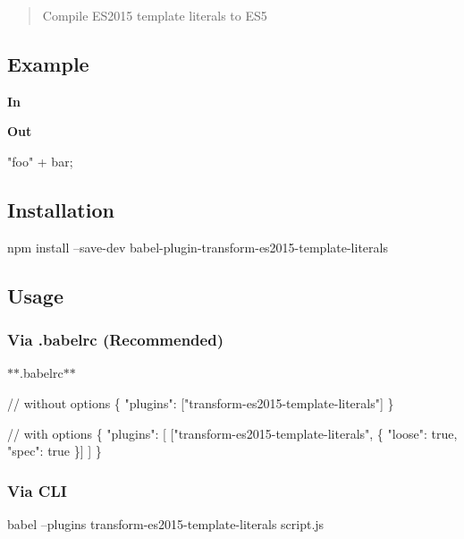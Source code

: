 \begin{quote}
Compile E\+S2015 template literals to E\+S5 \end{quote}


\subsection*{Example}

{\bfseries In}




{\bfseries Out}


\begin{DoxyCode}
"foo" + bar;
\end{DoxyCode}


\subsection*{Installation}


\begin{DoxyCode}
npm install --save-dev babel-plugin-transform-es2015-template-literals
\end{DoxyCode}


\subsection*{Usage}

\subsubsection*{Via {\ttfamily .babelrc} (Recommended)}

$\ast$$\ast$.babelrc$\ast$$\ast$


\begin{DoxyCode}
// without options
\{
  "plugins": ["transform-es2015-template-literals"]
\}

// with options
\{
  "plugins": [
    ["transform-es2015-template-literals", \{
      "loose": true,
      "spec": true
    \}]
  ]
\}
\end{DoxyCode}


\subsubsection*{Via C\+LI}


\begin{DoxyCode}
babel --plugins transform-es2015-template-literals script.js
\end{DoxyCode}


